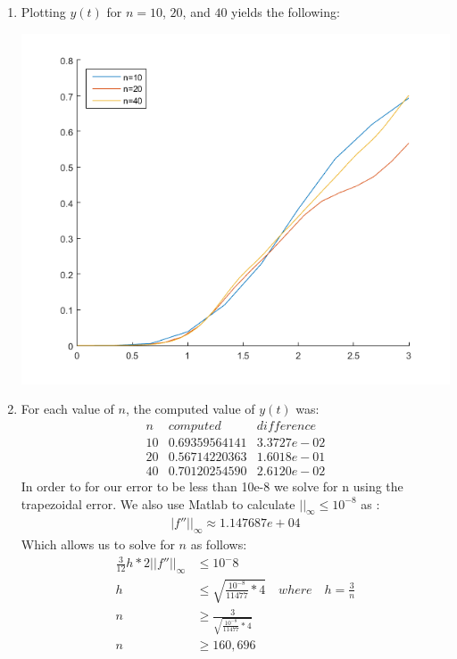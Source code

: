 \documentclass[11pt,a4paper]{article}
\begin{document}
\begin{itemize}
\begin{enumerate} [label={\alph*)}]
					\item Plotting $y(t)$ for $n=10$, $20$, and $40$ yields the following:
					\begin{center}
						\includegraphics[width=.75\linewidth]{ch6q15b}
					\end{center}	
					\item For each value of $n$, the computed value of $y(t)$ was:
					$$\begin{array}{c|c|c}
						n & computed & difference \\ \hline
						10 & 0.69359564141 & 3.3727e-02\\
						20 & 0.56714220363 & 1.6018e-01\\
						40 & 0.70120254590 & 2.6120e-02				
					\end{array}$$
					In order to for our error to be less than 10e-8 we solve for n using the trapezoidal error. We also use Matlab to calculate $\vert \vert_\infty \leq 10^{-8}$ as :
					\begin{align*}
						\vert f'' \vert \vert_\infty \approx 1.147687e+04
					\end{align*}
					Which allows us to solve for $n$ as follows:
					\begin{align*}
						\frac{3}{12}h*2\vert \vert f'' \vert \vert_\infty &\leq 10^-8 \\
						h &\leq \sqrt{\frac{10^{-8}}{11477}*4} \quad where \quad h=\frac{3}{n} \\
						n &\geq \frac{3}{\sqrt{\frac{10^{-8}}{11477}*4}} \\
						n &\geq 160,696
					\end{align*}
				\end{enumerate}
			

\end{itemize}
\end{document}
